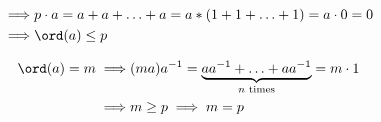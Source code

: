 \begin{align*}
  \implies & p \cdot a = a+a+ \ldots +a = a * (1+1+ \ldots +1) = a\cdot 0 = 0 \\
  \implies & \ord(a) \leq p
\end{align*}

\begin{align*}
  \ord(a) = m \implies 
  & (ma) a^{-1} = 
    \underbrace{aa^{-1} + \ldots + aa^{-1}}_{n\text{ times}} = m\cdot 1 \\
  \implies & m \geq p \implies m= p
\end{align*}








